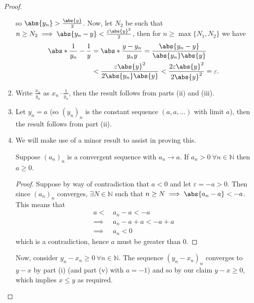 \documentclass[../real_analysis.tex]{subfiles}
\begin{document}
\begin{proof}
\begin{enumerate}[label={\upshape(\roman*)}]
                    so $\abs{y_n}>\frac{\abs{y}}{2}$. Now, let $N_2$ be such that $n\geq N_2\implies\abs{y_n-y}<\frac{\varepsilon\abs{y}^2}{2}$, then for $n\geq\max\{N_1, N_2\}$ we have
                    \begin{align}
                        \abs*{\frac{1}{y_n}-\frac{1}{y}}&=\abs*{\frac{y-y_n}{y_ny}}=\frac{\abs{y_n-y}}{\abs{y_n}\abs{y}}\\
                        &<\frac{\varepsilon\abs{y}^2}{2\abs{y_n}\abs{y}}<\frac{2\varepsilon\abs{y}^2}{2\abs{y}^2}=\varepsilon.
                    \end{align}
                    \item Write $\frac{x_n}{y_n}$ as $x_n\cdot\frac{1}{y_n}$, then the result follows from parts (ii) and (iii).
                    \item Let $y_n=a$ (so $(y_n)_n$ is the constant sequence $(a, a, \dots)$ with limit $a$), then the result follows from part (ii).
                    \item We will make use of a minor result to assist in proving this.
                    \begin{lemma}
                        Suppose $(a_n)_n$ is a convergent sequence with $a_n\to a$. If $a_n>0\ \forall n\in\mathbb{N}$ then $a\geq0$.
                    \end{lemma}
                    \begin{proof}
                        Suppose by way of contradiction that $a<0$ and let $\varepsilon=-a>0$. Then since $(a_n)_n$ converges, $\exists N\in\mathbb{N}$ such that $n\geq N\implies\abs{a_n-a}<-a$. This means that
                        \begin{align}
                            a<\, &a_n-a<-a\\
                            \implies &a_n-a+a<-a+a\\
                            \implies &a_n<0
                        \end{align}
                        which is a contradiction, hence $a$ must be greater than 0.
                    \end{proof}
                    Now, consider $y_n-x_n\geq0\ \forall n\in\mathbb{N}$. The sequence $(y_n-x_n)_n$ converges to $y-x$ by part (i) (and part (v) with $a=-1$) and so by our claim $y-x\geq0$, which implies $x\leq y$ as required.
                \end{enumerate}
            \end{proof}
\end{document}
